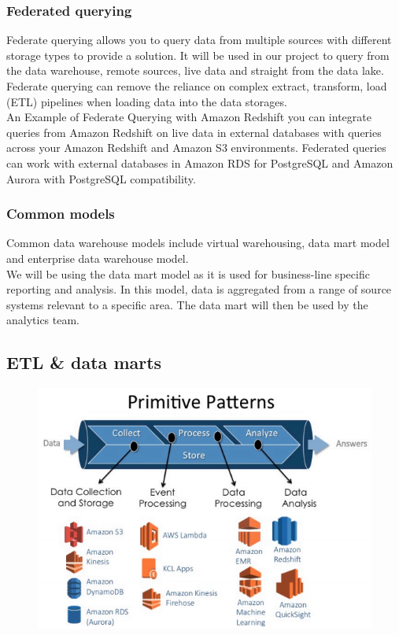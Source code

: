 \documentclass[10pt]{article}
\begin{document}
\subsubsection{Federated querying}
Federate querying allows you to query data from multiple sources with different storage types to provide a solution. It will be used in our project to query from the data warehouse, remote sources, live data and straight from the data lake. Federate querying can remove the reliance on complex extract, transform, load (ETL) pipelines when loading data into the data storages.
\\
An Example of Federate Querying with Amazon Redshift \cite{federate-queries} you can integrate queries from Amazon Redshift on live data in external databases with queries across your Amazon Redshift and Amazon S3 environments. Federated queries can work with external databases in Amazon RDS for PostgreSQL and Amazon Aurora with PostgreSQL compatibility.
\subsubsection{Common models}
Common data warehouse models \cite{data-modelling} include virtual warehousing, data mart model and enterprise data warehouse model.
\\
We will be using the data mart model as it is used for business-line specific reporting and analysis. In this model, data is aggregated from a range of source systems relevant to a specific area. The data mart will then be used by the analytics team.

\newpage
\subsection{ETL \& data marts}
\begin{figure}[h!]
	\centering
	\includegraphics[width=0.8\linewidth]{images/AWSAnalyticsPipeline.png}
	\cite{aws-warehousing}
\end{figure}
\end{document}

